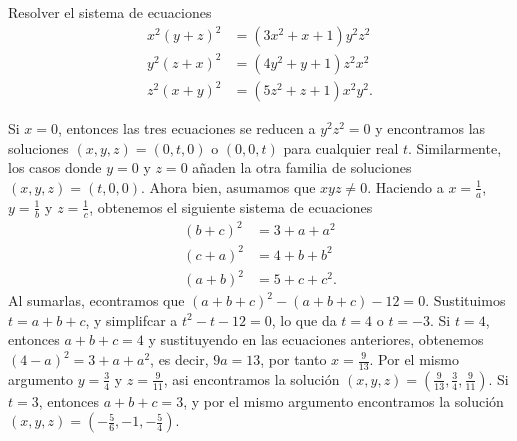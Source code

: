 \begin{example}
    Resolver el sistema de ecuaciones
    \begin{align*}
        x^2 (y + z)^2 &= (3x^2 + x + 1) y^2 z^2\\
        y^2 (z + x)^2 &= (4y^2 + y + 1) z^2 x^2\\
        z^2 (x + y)^2 &= (5z^2 + z + 1) x^2 y^2.
    \end{align*}
\end{example}
\begin{solution}
    Si $x = 0$, entonces las tres ecuaciones se reducen a $y^2 z^2 = 0$ y encontramos las soluciones $(x, y, z) = (0, t, 0)$ o $(0, 0, t)$ para cualquier real $t$.
    Similarmente, los casos donde $y = 0$ y $z = 0$ añaden la otra familia de soluciones $(x, y , z) = (t, 0, 0)$.
    Ahora bien, asumamos que $xyz \neq 0$.
    Haciendo a $x = \frac{1}{a}$, $y = \frac{1}{b}$ y $z = \frac{1}{c}$, obtenemos el siguiente sistema de ecuaciones
    \begin{align*}
        (b + c)^2 &= 3 + a + a^2\\
        (c + a)^2 &= 4 + b + b^2\\
        (a + b)^2 &= 5 + c + c^2.
    \end{align*}
    Al sumarlas, econtramos que $(a + b + c)^2 - (a + b + c) - 12 = 0$.
    Sustituimos $t = a + b + c$, y simplifcar a $t^2 - t - 12 = 0$, lo que da $t = 4$ o $t = -3$.
    Si $t = 4$, entonces $a + b + c = 4$ y sustituyendo en las ecuaciones anteriores, obtenemos $(4 - a)^2 = 3 + a + a^2$, es decir, $9a = 13$, por tanto $x = \frac{9}{13}$.
    Por el mismo argumento $y = \frac{3}{4}$ y $z = \frac{9}{11}$, asi encontramos la solución $(x,y,z) = \left(\frac{9}{13}, \frac{3}{4}, \frac{9}{11}\right)$.
    Si $t = 3$, entonces $a + b + c = 3$, y por el mismo argumento encontramos la solución $(x,y,z) = \left(-\frac{5}{6}, -1, -\frac{5}{4}\right)$.
\end{solution}

